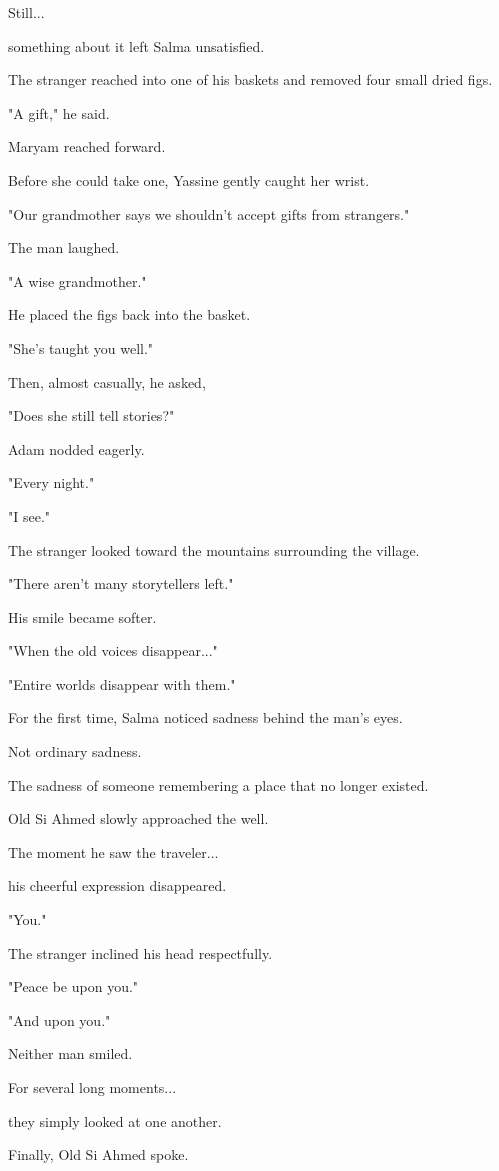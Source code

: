 \documentclass[12pt,openany]{book}
\begin{document}
Still...

something about it left Salma unsatisfied.

The stranger reached into one of his baskets and removed four small dried figs.

"A gift," he said.

Maryam reached forward.

Before she could take one, Yassine gently caught her wrist.

"Our grandmother says we shouldn't accept gifts from strangers."

The man laughed.

"A wise grandmother."

He placed the figs back into the basket.

"She's taught you well."

Then, almost casually, he asked,

"Does she still tell stories?"

Adam nodded eagerly.

"Every night."

"I see."

The stranger looked toward the mountains surrounding the village.

"There aren't many storytellers left."

His smile became softer.

"When the old voices disappear..."

"Entire worlds disappear with them."

For the first time, Salma noticed sadness behind the man's eyes.

Not ordinary sadness.

The sadness of someone remembering a place that no longer existed.

Old Si Ahmed slowly approached the well.

The moment he saw the traveler...

his cheerful expression disappeared.

"You."

The stranger inclined his head respectfully.

"Peace be upon you."

"And upon you."

Neither man smiled.

For several long moments...

they simply looked at one another.

Finally, Old Si Ahmed spoke.
\end{document}
